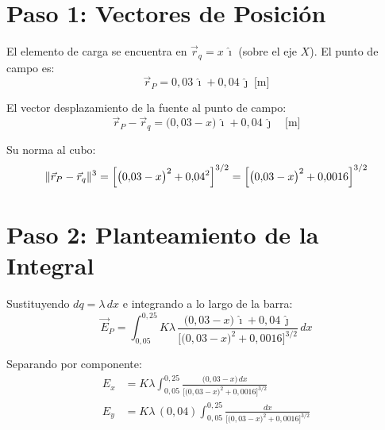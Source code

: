 \documentclass[12pt,letterpaper]{article}
\begin{document}
\section*{Paso 1: Vectores de Posici\'on}

El elemento de carga se encuentra en $\vec{r}_q = x\,\hat{\imath}$ (sobre el eje $X$). El punto de campo es:
\begin{equation*}
    \vec{r}_P = 0{,}03\,\hat{\imath} + 0{,}04\,\hat{\jmath}\;\text{[m]}
\end{equation*}

El vector desplazamiento de la fuente al punto de campo:
\begin{equation*}
    \vec{r}_P - \vec{r}_q
    = \bigl(0{,}03 - x\bigr)\,\hat{\imath} + 0{,}04\,\hat{\jmath}
    \quad\text{[m]}
\end{equation*}

Su norma al cubo:
\begin{equation*}
    \|\vec{r}_P - \vec{r}_q\|^3
    = \Bigl[\bigl(0{,}03 - x\bigr)^2 + 0{,}04^2\Bigr]^{3/2}
    = \Bigl[\bigl(0{,}03 - x\bigr)^2 + 0{,}0016\Bigr]^{3/2}
\end{equation*}

\section*{Paso 2: Planteamiento de la Integral}

Sustituyendo $dq = \lambda\,dx$ e integrando a lo largo de la barra:
\begin{equation*}
    \vec{E}_P
    = \int_{0{,}05}^{0{,}25}
      K\lambda\,
      \frac{\bigl(0{,}03 - x\bigr)\,\hat{\imath} + 0{,}04\,\hat{\jmath}}
           {\bigl[\bigl(0{,}03 - x\bigr)^2 + 0{,}0016\bigr]^{3/2}}\,dx
\end{equation*}

Separando por componente:
\begin{align*}
    E_x &= K\lambda
    \int_{0{,}05}^{0{,}25}
    \frac{\bigl(0{,}03 - x\bigr)\,dx}{\bigl[\bigl(0{,}03 - x\bigr)^2 + 0{,}0016\bigr]^{3/2}}
    \\[8pt]
    E_y &= K\lambda\,(0{,}04)
    \int_{0{,}05}^{0{,}25}
    \frac{dx}{\bigl[\bigl(0{,}03 - x\bigr)^2 + 0{,}0016\bigr]^{3/2}}
\end{align*}
\end{document}
